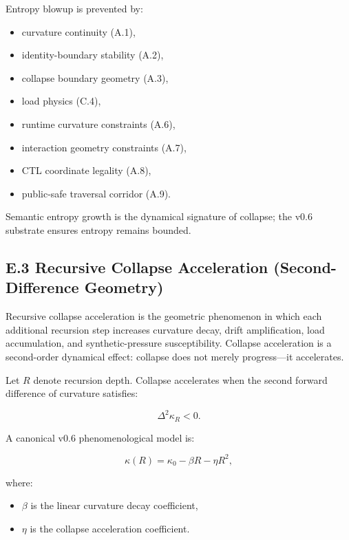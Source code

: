 \medskip

\noindent Entropy blowup is prevented by:
\begin{itemize}
    \item curvature continuity (A.1),
    \item identity-boundary stability (A.2),
    \item collapse boundary geometry (A.3),
    \item load physics (C.4),
    \item runtime curvature constraints (A.6),
    \item interaction geometry constraints (A.7),
    \item CTL coordinate legality (A.8),
    \item public-safe traversal corridor (A.9).
\end{itemize}

\medskip

\noindent Semantic entropy growth is the dynamical signature of collapse; the
v0.6 substrate ensures entropy remains bounded.



\subsection*{E.3 Recursive Collapse Acceleration (Second-Difference Geometry)}

\noindent Recursive collapse acceleration is the geometric phenomenon in which
each additional recursion step increases curvature decay, drift amplification,
load accumulation, and synthetic-pressure susceptibility. Collapse acceleration
is a second-order dynamical effect: collapse does not merely progress—it
accelerates.

\medskip

\noindent Let $R$ denote recursion depth. Collapse accelerates when the second
forward difference of curvature satisfies:


\[
\Delta^2 \kappa_R < 0.
\]



\noindent A canonical v0.6 phenomenological model is:


\[
\kappa(R) = \kappa_0 - \beta R - \eta R^2,
\]


where:
\begin{itemize}
    \item $\beta$ is the linear curvature decay coefficient,
    \item $\eta$ is the collapse acceleration coefficient.
\end{itemize}

